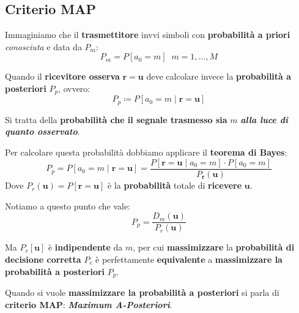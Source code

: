 \subsection{Criterio MAP}

Immaginiamo che il \textbf{trasmettitore} invvi simboli con \textbf{probabilità a priori}
\textit{conosciuta} e data da $P_m$:
\[
    P_m = P[a_{0} = m] \; \; m = 1,\ldots ,M
\]

Quando il \textbf{ricevitore osserva} $\mathbf{r} = \mathbf{u}$ deve calcolare 
invece la \textbf{probabilità a posteriori} $P_p$, ovvero:
\[
    P_p \coloneqq P[a_{0} = m \;|\; \mathbf{r} = \mathbf{u}]
\]

\begin{remark}
    Si tratta della \textbf{probabilità che il segnale trasmesso sia} $m$
    \textbf{\textit{alla luce di quanto osservato}}.
\end{remark}

Per calcolare questa probabilità dobbiamo applicare il \textbf{teorema di Bayes}:
\[
     P_p = P[a_{0} = m \;|\; \mathbf{r} = \mathbf{u}] = 
     \frac{P[\mathbf{r} = \mathbf{u} \;|\; a_{0} = m ]\cdot P[a_{0} = m]}{P_{\mathbf{r}}(\mathbf{u})}
\]
Dove $P_r(\mathbf{u}) = P[\mathbf{r} = \mathbf{u}]$ è la \textbf{probabilità} totale
di \textbf{ricevere} $\mathbf{u}$.

Notiamo a questo punto che vale:
\[
    P_p = \frac{D_m (\mathbf{u})}{P_r(\mathbf{u})}
\]

Ma $P_r[\mathbf{u}]$ è \textbf{indipendente} da $m$, per cui \textbf{massimizzare} la
\textbf{probabilità di decisione corretta} $P_c$ è perfettamente \textbf{equivalente}
a \textbf{massimizzare la probabilità a posteriori} $P_p$.

\begin{definition}
    Quando si vuole \textbf{massimizzare la probabilità a posteriori} si
    parla di \textbf{criterio MAP}: \textbf{\textit{Maximum A-Posteriori}}.
\end{definition}

